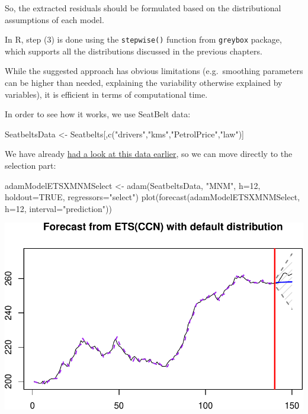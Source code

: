 \documentclass[
]{book}
\newenvironment{Shaded}{\begin{snugshade}}{\end{snugshade}}
\newcommand{\AttributeTok}[1]{\textcolor[rgb]{0.77,0.63,0.00}{#1}}
\newcommand{\ConstantTok}[1]{\textcolor[rgb]{0.00,0.00,0.00}{#1}}
\newcommand{\DecValTok}[1]{\textcolor[rgb]{0.00,0.00,0.81}{#1}}
\newcommand{\FunctionTok}[1]{\textcolor[rgb]{0.00,0.00,0.00}{#1}}
\newcommand{\NormalTok}[1]{#1}
\newcommand{\OtherTok}[1]{\textcolor[rgb]{0.56,0.35,0.01}{#1}}
\newcommand{\StringTok}[1]{\textcolor[rgb]{0.31,0.60,0.02}{#1}}
\theoremstyle{definition}
\theoremstyle{definition}
\theoremstyle{definition}
\theoremstyle{definition}
\theoremstyle{remark}
\begin{document}
So, the extracted residuals should be formulated based on the distributional assumptions of each model.

In R, step (3) is done using the \texttt{stepwise()} function from \texttt{greybox} package, which supports all the distributions discussed in the previous chapters.

While the suggested approach has obvious limitations (e.g.~smoothing parameters can be higher than needed, explaining the variability otherwise explained by variables), it is efficient in terms of computational time.

In order to see how it works, we use SeatBelt data:

\begin{Shaded}
\begin{Highlighting}[]
\NormalTok{SeatbeltsData }\OtherTok{\textless{}{-}}\NormalTok{ Seatbelts[,}\FunctionTok{c}\NormalTok{(}\StringTok{"drivers"}\NormalTok{,}\StringTok{"kms"}\NormalTok{,}\StringTok{"PetrolPrice"}\NormalTok{,}\StringTok{"law"}\NormalTok{)]}
\end{Highlighting}
\end{Shaded}

We have already \protect\hyperlink{ETSXRExample}{had a look at this data earlier}, so we can move directly to the selection part:

\begin{Shaded}
\begin{Highlighting}[]
\NormalTok{adamModelETSXMNMSelect }\OtherTok{\textless{}{-}} \FunctionTok{adam}\NormalTok{(SeatbeltsData, }\StringTok{"MNM"}\NormalTok{,}
                               \AttributeTok{h=}\DecValTok{12}\NormalTok{, }\AttributeTok{holdout=}\ConstantTok{TRUE}\NormalTok{,}
                               \AttributeTok{regressors=}\StringTok{"select"}\NormalTok{)}
\FunctionTok{plot}\NormalTok{(}\FunctionTok{forecast}\NormalTok{(adamModelETSXMNMSelect, }\AttributeTok{h=}\DecValTok{12}\NormalTok{, }\AttributeTok{interval=}\StringTok{"prediction"}\NormalTok{))}
\end{Highlighting}
\end{Shaded}

\includegraphics{adam_files/figure-latex/unnamed-chunk-179-1.pdf}
\end{document}
